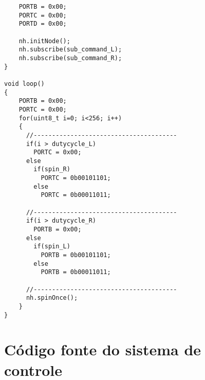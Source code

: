 \begin{lstlisting}
    PORTB = 0x00;
    PORTC = 0x00;
    PORTD = 0x00;
  
    nh.initNode();
    nh.subscribe(sub_command_L); 
    nh.subscribe(sub_command_R);
}

void loop()
{
    PORTB = 0x00;
    PORTC = 0x00;
    for(uint8_t i=0; i<256; i++)
    {     
      //---------------------------------------
      if(i > dutycycle_L)
        PORTC = 0x00;
      else
        if(spin_R)
          PORTC = 0b00101101;
        else
          PORTC = 0b00011011;

      //---------------------------------------
      if(i > dutycycle_R)
        PORTB = 0x00;      
      else
        if(spin_L)
          PORTB = 0b00101101;
        else
          PORTB = 0b00011011;

      //---------------------------------------
      nh.spinOnce(); 
    }   	
}
\end{lstlisting}
\pagebreak 

\chapter{Código fonte do sistema de controle}
\label{app:controller}
	
